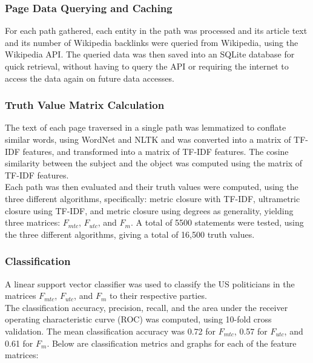 \documentclass[10pt,11pt,12pt,oneside]{book}
\begin{document}
\subsubsection{Page Data Querying and Caching}
For each path gathered, each entity in the path was processed and its article text and its number of Wikipedia backlinks were queried from Wikipedia, using the Wikipedia API. The queried data was then saved into an SQLite database for quick retrieval, without having to query the API or requiring the internet to access the data again on future data accesses.

\subsubsection{Truth Value Matrix Calculation}

The text of each page traversed in a single path was lemmatized to conflate similar words, using WordNet and NLTK and was converted into a matrix of TF-IDF features, and transformed into a matrix of TF-IDF features. The cosine similarity between the subject and the object was computed using the matrix of TF-IDF features.\\

Each path was then evaluated and their truth values were computed, using the three different algorithms, specifically: metric closure with TF-IDF, ultrametric closure using TF-IDF, and metric closure using degrees as generality, yielding three matrices: $ F_{mtc} $, $ F_{utc} $, and $ F_{m} $. A total of 5500 statements were tested, using the three different algorithms, giving a total of 16,500 truth values.\\ 

\subsubsection{Classification}
A linear support vector classifier was used to classify the US politicians in the matrices $ F_{mtc} $, $ F_{utc} $, and $ F_{m} $ to their respective parties.\\

The classification accuracy, precision, recall, and the area under the receiver operating characteristic curve (ROC) was computed, using 10-fold cross validation. The mean classification accuracy was 0.72 for $ F_{mtc} $, 0.57 for $ F_{utc} $, and 0.61 for $ F_{m} $. Below are classification metrics and graphs for each of the feature matrices:
\newpage
\end{document}
